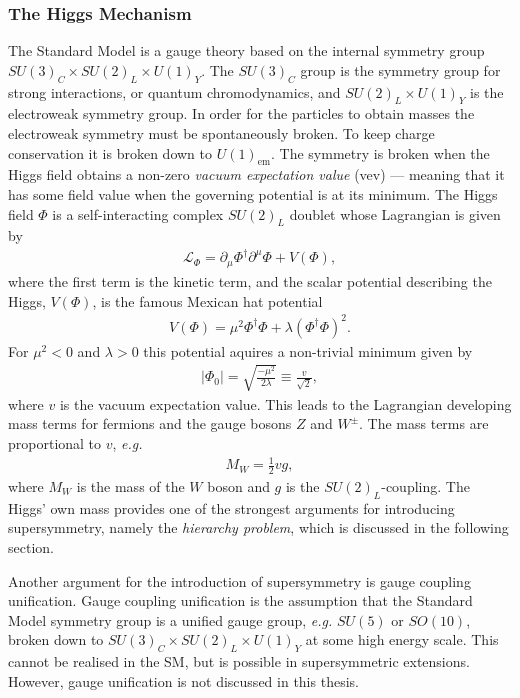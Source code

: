 \documentclass[twoside,english]{uiofysmaster}
\begin{document}
\subsubsection{The Higgs Mechanism}\label{Sec:: phys back : The Higgs Mechanism}

The Standard Model is a gauge theory based on the internal symmetry group $SU(3)_C \times SU(2)_L \times U(1)_Y$. The $SU(3)_C$ group is the symmetry group for strong interactions, or quantum chromodynamics, and $SU(2)_L \times U(1)_Y$ is the electroweak symmetry group. In order for the particles to obtain masses the electroweak symmetry must be spontaneously broken. To keep charge conservation it is broken down to $U(1)_{\mathrm{em}}$. The symmetry is broken when the Higgs field obtains a non-zero \textit{vacuum expectation value} (vev) --- meaning that it has some field value when the governing potential is at its minimum. The Higgs field $\Phi$ is a self-interacting complex $SU(2)_L$ doublet whose Lagrangian is given by
\begin{align}
\mathcal{L}_{\Phi} = \partial_{\mu} \Phi^{\dagger} \partial^{\mu} \Phi + V(\Phi),
\end{align}
where the first term is the kinetic term, and the scalar potential describing the Higgs, $V(\Phi)$, is the famous Mexican hat potential
\begin{align}
V(\Phi) = \mu^2 \Phi^{\dagger} \Phi + \lambda (\Phi^{\dagger} \Phi)^2.
\end{align}
For $\mu^2 < 0$ and $\lambda > 0$ this potential aquires a non-trivial minimum given by
\begin{align}
|\Phi_0| = \sqrt{\frac{-\mu^2}{2\lambda}} \equiv \frac{v}{\sqrt{2}},
\end{align}
where $v$ is the vacuum expectation value. This leads to the Lagrangian developing mass terms for fermions and the gauge bosons $Z$ and $W^{\pm}$. The mass terms are proportional to $v$, \textit{e.g.}
\begin{align*}
M_W = \frac{1}{2} v g,
\end{align*}
where $M_W$ is the mass of the $W$ boson and $g$ is the $SU(2)_L$-coupling. The Higgs' own mass provides one of the strongest arguments for introducing supersymmetry, namely the \textit{hierarchy problem}, which is discussed in the following section. 

Another argument for the introduction of supersymmetry is gauge coupling unification. Gauge coupling unification is the assumption that the Standard Model symmetry group is a unified gauge group, \textit{e.g.} $SU(5)$ or $SO(10)$, broken down to $SU(3)_C \times SU(2)_L \times U(1)_Y$ at some high energy scale. This cannot be realised in the SM, but is possible in supersymmetric extensions. However, gauge unification is not discussed in this thesis.
\end{document}
